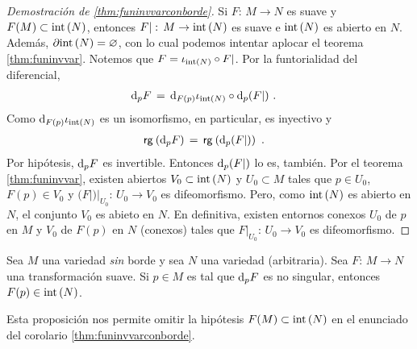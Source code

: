 \begin{proof}[Demostraci\'{o}n de \ref{thm:funinvvarconborde}]
	Si $F:\,M\rightarrow N$ es suave y $F(M)\subset\interior{N}$,
	entonces $F|:\,M\rightarrow\interior{N}$ es suave e $\interior{N}$
	es abierto en $N$. Adem\'{a}s, $\borde[\interior{N}]=\varnothing$,
	con lo cual podemos intentar aplocar el teorema \ref{thm:funinvvar}.
	Notemos que $F=\inc[\interior{N}]\circ F|$. Por la
	funtorialidad del diferencial,
	\begin{align*}
		\diferencial[p]{F} & \,=\,
			\diferencial[F(p)]{\inc[\interior{N}]}\circ
			\diferencial[p]{(F|)}
		\text{ .}
	\end{align*}
	Como $\diferencial[F(p)]{\inc[\interior{N}]}$ es un isomorfismo,
	en particular, es inyectivo y
	\begin{align*}
		\rango{\diferencial[p]{F}} & \,=\,
			\rango{\diferencial[p]{(F|)}}
		\text{ .}
	\end{align*}
	Por hip\'{o}tesis, $\diferencial[p]{F}$ es invertible. Entonces
	$\diferencial[p]{(F|)}$ lo es, tambi\'{e}n. Por el teorema
	\ref{thm:funinvvar}, existen abiertos $V_{0}\subset\interior{N}$
	y $U_{0}\subset M$ tales que $p\in U_{0}$, $F(p)\in V_{0}$ y
	$(F|)|_{U_{0}}:\,U_{0}\rightarrow V_{0}$ es difeomorfismo. Pero,
	como $\interior{N}$ es abierto en $N$, el conjunto $V_{0}$ es abieto
	en $N$. En definitiva, existen entornos conexos $U_{0}$ de $p$ en
	$M$ y $V_{0}$ de $F(p)$ en $N$ (conexos) tales que
	$F|_{U_{0}}:\,U_{0}\rightarrow V_{0}$ es difeomorfismo.
\end{proof}

\begin{propoDiferencialInvertibleCaeEnElInterior}\label{thm:caeenelinterior}
	Sea $M$ una variedad \emph{sin} borde y sea $N$ una variedad
	(arbitraria). Sea $F:\,M\rightarrow N$ una transformaci\'{o}n
	suave. Si $p\in M$ es tal que $\diferencial[p]{F}$ es no
	singular, entonces $F(p)\in\interior{N}$.
\end{propoDiferencialInvertibleCaeEnElInterior}

Esta proposici\'{o}n nos permite omitir la hip\'{o}tesis
$F(M)\subset\interior{N}$ en el enunciado del corolario
\ref{thm:funinvvarconborde}.

